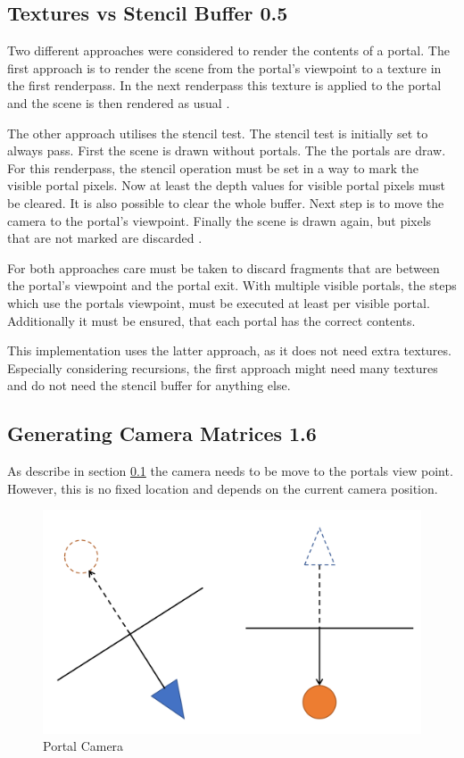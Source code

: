 \subsection{Textures vs Stencil Buffer 0.5}
\label{section:textursVsStencil}
Two different approaches were considered to render the contents of a portal. The first approach is to render the scene from the portal's viewpoint to a texture in the first renderpass. In the next renderpass this texture is applied to the portal and the scene is then rendered as usual \cite{lecture:portalProblems}.  %

The other approach utilises the stencil test. The stencil test is initially set to always pass. First the scene is drawn without portals.
The the portals are draw. For this renderpass, the stencil operation must be set in a way to mark the visible portal pixels. Now at least the depth values for visible portal pixels must be cleared. It is also possible to clear the whole buffer. Next step is to move the camera to the portal's viewpoint. Finally the scene is drawn again, but pixels that are not marked are discarded \cites{schmalstieg:1999:sewing, lowe:2005:technique, lecture:portalProblems}.

For both approaches care must be taken to discard fragments that are between the portal's viewpoint and the portal exit. With multiple visible portals, the steps which use the portals viewpoint, must be executed at least per visible portal. Additionally it must be ensured, that each portal has the correct contents.

This implementation uses the latter approach, as it does not need extra textures. Especially considering recursions, the first approach might need many textures and do not need the stencil buffer for anything else.

\subsection{Generating Camera Matrices 1.6}
As describe in section \ref{section:textursVsStencil} the camera needs to be move to the portals view point. However, this is no fixed location and depends on the current camera position.

\begin{figure}[h]
	\includegraphics[width=\linewidth]{images/camera_matrices.png}
	\caption{Portal Camera}
	\label{fig:cameramatrices}
\end{figure}

